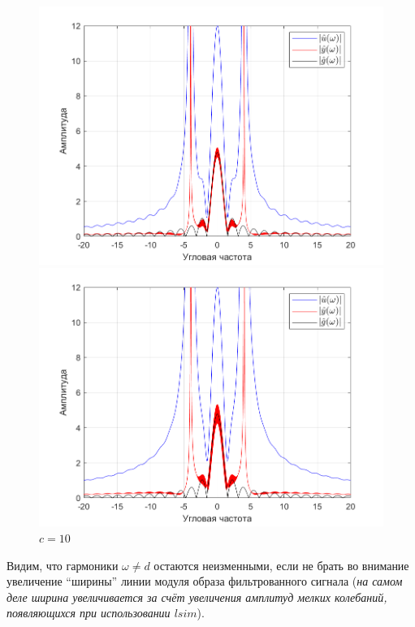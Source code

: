 \documentclass[a4paper]{article}
\begin{document}
\begin{figure}[H]
    \begin{minipage}{0.5\textwidth}
        \centering
        \includegraphics[width=\linewidth]{ex1_2/приближение/a1=0_a2=25_b1=10.5_b2=25_d=4_c=5/h4.png}
        \caption{$c=5$}
    \end{minipage}
    \begin{minipage}{0.5\textwidth}
        \centering
        \includegraphics[width=\linewidth]{ex1_2/приближение/a1=0_a2=25_b1=10.5_b2=25_d=4_c=10/h4.png}
        \caption{$c=10$}
    \end{minipage}
\end{figure}

Видим, что гармоники $\omega \ne d$ остаются неизменными, если не брать во внимание увеличение ``ширины'' линии модуля образа фильтрованного сигнала (\textit{на самом деле ширина увеличивается за счёт увеличения амплитуд мелких колебаний, появляющихся при использовании $lsim$}).
\end{document}
